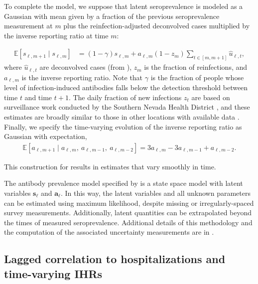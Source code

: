 \begin{linenomath*}
To complete the model, we suppose that latent seroprevalence is modeled as a
Gaussian with mean given by a fraction of the previous seroprevalence
measurement at $m$ plus the reinfection-adjusted deconvolved cases multiplied by
the inverse reporting ratio at time $m$:
\end{linenomath*}
\begin{linenomath*}
\begin{align}
  \label{eq:expect-sero}
\mathbb{E}[s_{\ell,m+1} \mid s_{\ell,m}] & = (1 -\gamma) s_{\ell,m} 
+ a_{\ell,m} (1 - z_{m}) \sum_{t\in[m,m+1]}\widehat{u}_{\ell,t},
\end{align}
where $\widehat{u}_{\ell,t}$ are deconvolved cases (from
), $z_{m}$ is the fraction of reinfections, and
$a_{\ell,m}$ is the inverse reporting ratio. Note that $\gamma$ is the fraction
of people whose level of infection-induced antibodies falls below the detection
threshold between time $t$ and time $t+1$. The daily fraction of new infections
$z_t$ are based on surveillance work conducted by the Southern Nevada Health
District \citep{ruff2022rapid}, and these estimates are broadly similar to those
in other locations with available data  \citep{ruff2022rapid, nyreinfect2021,
hireinfect2022, wareinfect2022}. Finally, we specify the time-varying evolution
of the inverse reporting ratio as Gaussian with expectation,
\begin{align}
  \label{eq:report-ratio}
\mathbb{E}[a_{\ell,m+1} \mid a_{\ell,m},\ a_{\ell,m-1},\ a_{\ell,m-2}] = 3a_{\ell,m} - 3a_{\ell,m-1} + a_{\ell,m-2}.
\end{align}
\end{linenomath*}
This construction for  results in estimates that vary
smoothly in time.

    
The antibody prevalence model specified by
 is a state space model with
latent variables $\mathbf{s}_{\ell}$ and $\mathbf{a}_{\ell}$. In this way, 
the latent variables and all unknown parameters can be estimated using maximum likelihood, despite
missing or irregularly-spaced survey
measurements. Additionally, latent quantities can be extrapolated beyond the
times of measured seroprevalence. Additional details of
this methodology and the computation of the associated uncertainty measurements
are in .



\subsection{Lagged correlation to hospitalizations and time-varying IHRs} 
\label{sec:ihr-calculations}

